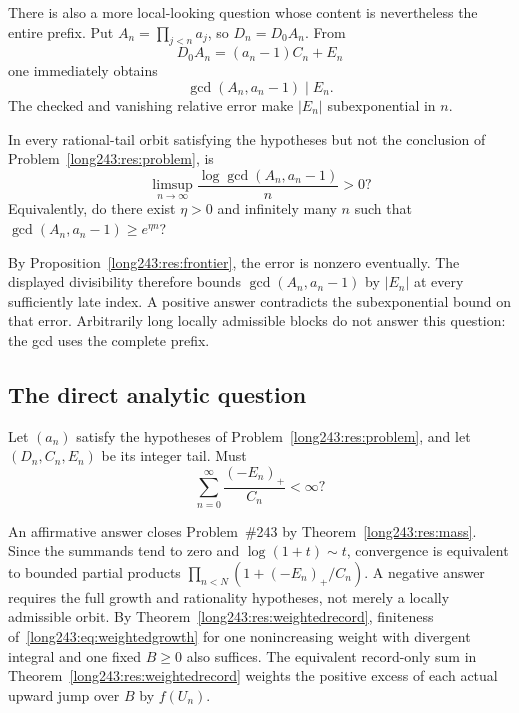 There is also a more local-looking question whose content is nevertheless the
entire prefix.  Put $A_n=\prod_{j<n}a_j$, so $D_n=D_0A_n$.  From
\[
 D_0A_n=(a_n-1)C_n+E_n
\]
one immediately obtains
\[
 \gcd(A_n,a_n-1)\mid E_n.
\]
The checked
and vanishing relative error make $|E_n|$ subexponential in $n$.

\begin{problem}\label{long243:res:prefixgcd}
In every rational-tail orbit satisfying the hypotheses but not the conclusion of Problem~\ref{long243:res:problem}, is
\[
 \limsup_{n\to\infty}
 \frac{\log\gcd(A_n,a_n-1)}{n}>0?
\]
Equivalently, do there exist $\eta>0$ and infinitely many $n$ such that
$\gcd(A_n,a_n-1)\ge e^{\eta n}$?
\end{problem}

\noindent By Proposition~\ref{long243:res:frontier}, the error is nonzero
eventually. The displayed divisibility therefore bounds
$\gcd(A_n,a_n-1)$ by $|E_n|$ at every sufficiently late index.
A positive answer contradicts the subexponential bound on that error.
Arbitrarily long locally admissible blocks do
not answer this question: the gcd uses the complete prefix.

\subsection{The direct analytic question}

\begin{problem}\label{long243:res:masshyp}
Let $(a_n)$ satisfy the hypotheses of Problem~\ref{long243:res:problem},
and let $(D_n,C_n,E_n)$ be its integer tail. Must
\[
 \sum_{n=0}^{\infty}\frac{(-E_n)_+}{C_n}<\infty ?
\]
\end{problem}

\noindent An affirmative answer closes Problem~\#243 by
Theorem~\ref{long243:res:mass}. Since the summands tend to zero and
$\log(1+t)\sim t$, convergence is equivalent to bounded partial products
$\prod_{n<N}(1+(-E_n)_+/C_n)$. A negative answer requires the full
growth and rationality hypotheses, not merely a locally admissible orbit.
By Theorem~\ref{long243:res:weightedrecord}, finiteness
of~\eqref{long243:eq:weightedgrowth} for one nonincreasing weight with
divergent integral and one fixed $B\ge0$ also suffices. The equivalent
record-only sum in Theorem~\ref{long243:res:weightedrecord} weights the
positive excess of each actual upward jump over $B$ by $f(U_n)$.

